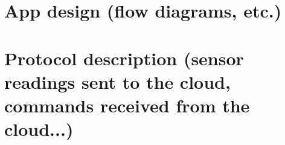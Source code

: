 \documentclass[conference]{IEEEtran}
\begin{document}
\section{App design (flow diagrams, etc.)}
%
%
%

\section{Protocol description (sensor readings sent to the cloud, commands received from the cloud...)}
%
%
\end{document}
